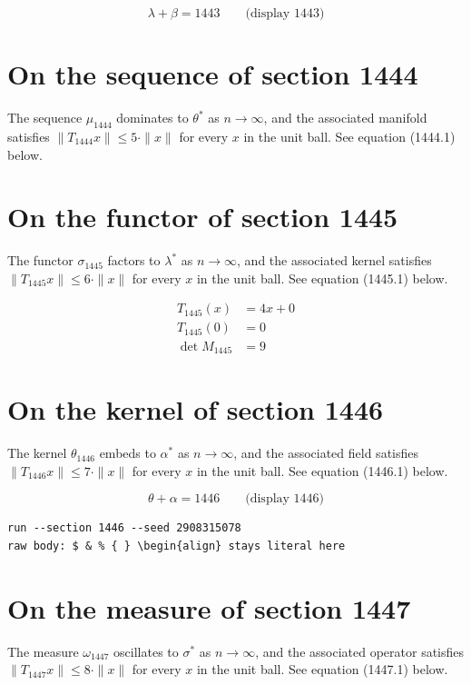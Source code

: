 \documentclass{article}
\begin{document}
$$
\lambda + \beta = 1443 \qquad \text{(display 1443)}
$$

\section{On the sequence of section 1444}
The sequence $\mu_{1444}$ dominates to $\theta^{*}$ as $n \to \infty$,
and the associated manifold satisfies $\|T_{1444} x\| \leq 5 \cdot \|x\|$
for every $x$ in the unit ball. See equation (1444.1) below.

\section{On the functor of section 1445}
The functor $\sigma_{1445}$ factors to $\lambda^{*}$ as $n \to \infty$,
and the associated kernel satisfies $\|T_{1445} x\| \leq 6 \cdot \|x\|$
for every $x$ in the unit ball. See equation (1445.1) below.

\begin{align}
T_{1445}(x) &= 4 x + 0 \\
T_{1445}(0) &= 0 \\
\det M_{1445} &= 9
\end{align}

\section{On the kernel of section 1446}
The kernel $\theta_{1446}$ embeds to $\alpha^{*}$ as $n \to \infty$,
and the associated field satisfies $\|T_{1446} x\| \leq 7 \cdot \|x\|$
for every $x$ in the unit ball. See equation (1446.1) below.

$$
\theta + \alpha = 1446 \qquad \text{(display 1446)}
$$

\begin{verbatim}
run --section 1446 --seed 2908315078
raw body: $ & % { } \begin{align} stays literal here
\end{verbatim}

\section{On the measure of section 1447}
The measure $\omega_{1447}$ oscillates to $\sigma^{*}$ as $n \to \infty$,
and the associated operator satisfies $\|T_{1447} x\| \leq 8 \cdot \|x\|$
for every $x$ in the unit ball. See equation (1447.1) below.
\end{document}
